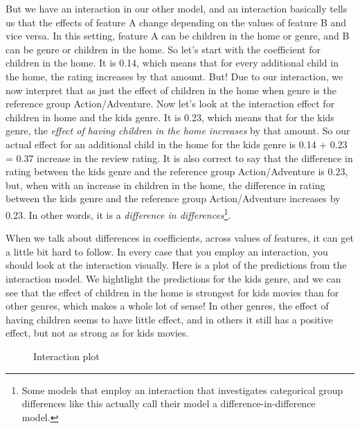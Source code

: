 \documentclass[
  letterpaper,
]{krantz}
\begin{document}
But we have an interaction in our other model, and an interaction
basically tells us that the effects of feature A change depending on the
values of feature B and vice versa. In this setting, feature A can be
children in the home or genre, and B can be genre or children in the
home. So let's start with the coefficient for children in the home. It
is 0.14, which means that for every additional child in the home, the
rating increases by that amount. But! Due to our interaction, we now
interpret that as just the effect of children in the home when genre is
the reference group Action/Adventure. Now let's look at the interaction
effect for children in home and the kids genre. It is 0.23, which means
that for the kids genre, the \emph{effect of having children in the home
increases} by that amount. So our actual effect for an additional child
in the home for the kids genre is 0.14 + 0.23 = 0.37 increase in the
review rating. It is also correct to say that the difference in rating
between the kids genre and the reference group Action/Adventure is 0.23,
but, when with an increase in children in the home, the difference in
rating between the kids genre and the reference group Action/Adventure
increases by 0.23. In other words, it is a \emph{difference in
differences}\footnote{Some models that employ an interaction that
  investigates categorical group differences like this actually call
  their model a difference-in-difference model.}.

When we talk about differences in coefficients, across values of
features, it can get a little bit hard to follow. In every case that you
employ an interaction, you should look at the interaction visually. Here
is a plot of the predictions from the interaction model. We hightlight
the predictions for the kids genre, and we can see that the effect of
children in the home is strongest for kids movies than for other genres,
which makes a whole lot of sense! In other genres, the effect of having
children seems to have little effect, and in others it still has a
positive effect, but not as strong as for kids movies.

\begin{figure}[H]


\caption{\label{fig-model-interaction-plot}Interaction plot}

\end{figure}%
\end{document}
